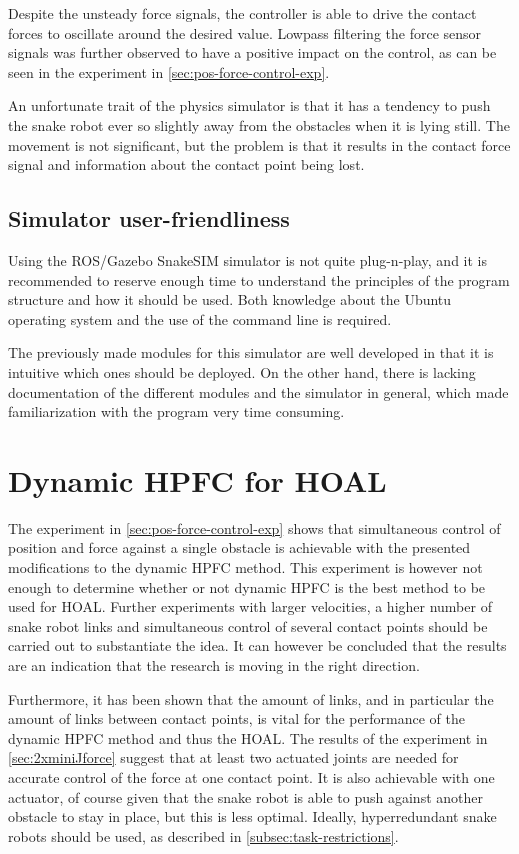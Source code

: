 Despite the unsteady force signals, the controller is able to drive the contact forces to oscillate around the desired value. Lowpass filtering the force sensor signals was further observed to have a positive impact on the control, as can be seen in the experiment in \ref{sec:pos-force-control-exp}.

An unfortunate trait of the physics simulator is that it has a tendency to push the snake robot ever so slightly away from the obstacles when it is lying still. The movement is not significant, but the problem is that it results in the contact force signal and information about the contact point being lost.

\subsection{Simulator user-friendliness}

Using the ROS/Gazebo SnakeSIM simulator is not quite plug-n-play, and it is recommended to reserve enough time to understand the principles of the program structure and how it should be used. Both knowledge about the Ubuntu operating system and the use of the command line is required.

The previously made modules for this simulator are well developed in that it is intuitive which ones should be deployed. On the other hand, there is lacking documentation of the different modules and the simulator in general, which made familiarization with the program very time consuming.

\section{Dynamic HPFC for HOAL}

The experiment in \ref{sec:pos-force-control-exp} shows that simultaneous control of position and force against a single obstacle is achievable with the presented modifications to the dynamic HPFC method. This experiment is however not enough to determine whether or not dynamic HPFC is the best method to be used for HOAL. Further experiments with larger velocities, a higher number of snake robot links and simultaneous control of several contact points should be carried out to substantiate the idea. It can however be concluded that the results are an indication that the research is moving in the right direction.

Furthermore, it has been shown that the amount of links, and in particular the amount of links between contact points, is vital for the performance of the dynamic HPFC method and thus the HOAL. The results of the experiment in \ref{sec:2xminiJforce} suggest that at least two actuated joints are needed for accurate control of the force at one contact point. It is also achievable with one actuator, of course given that the snake robot is able to push against another obstacle to stay in place, but this is less optimal. Ideally, hyperredundant snake robots should be used, as described in \ref{subsec:task-restrictions}.

